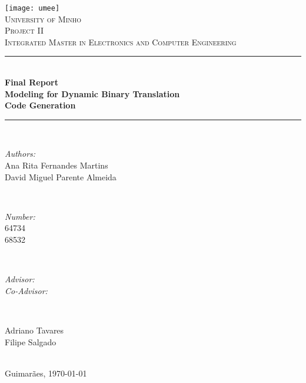 \documentclass{report}
\begin{document}
	\begin{titlepage}
		\centering
		\vspace*{0.5 cm}
		\texttt{[image: umee]}\\[1.0 cm]
		\textsc{\LARGE University of Minho}\\[2.0 cm]
		\textsc{\Large Project II}\\[0.5 cm]		
		\textsc{\large Integrated Master in Electronics and Computer Engineering}\\[0.5 cm]				%
		\rule{\linewidth}{0.2 mm} \\[0.4 cm]
			{ \huge \bfseries Final Report} \\
            { \huge \bfseries Modeling for Dynamic Binary Translation \\
 			\LARGE \bfseries Code Generation}
			
		\rule{\linewidth}{0.2 mm} \\[1.5 cm]
			
			\begin{minipage}{0.4\textwidth}
				\begin{flushleft} \large
					\emph{Authors:}\\
					Ana Rita Fernandes Martins\\
					David Miguel Parente Almeida
				\end{flushleft}
			\end{minipage}~
			\begin{minipage}{0.4\textwidth}
				\begin{flushright} \large
					\emph{Number:} \\
					64734 \\
					68532
				\end{flushright}
			\end{minipage}\\[2 cm]
            
			\begin{minipage}{0.4\textwidth}
				\begin{flushright} \large
					\emph{Advisor:}\\
     				\emph{Co-Advisor:}
				\end{flushright}
			\end{minipage}~
			\begin{minipage}{0.4\textwidth}
				\begin{flushleft} \large
					Adriano Tavares\\
					Filipe Salgado 
				\end{flushleft}
			\end{minipage}\\[2 cm]
			
		{\large Guimarães, \today }\\[2 cm]
			
		\vfill
		
	\end{titlepage}
	
\end{document}
